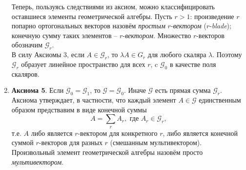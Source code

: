 \documentclass[12pt]{article}
\begin{document}
\begin{enumerate}
    Теперь, пользуясь следствиями из аксиом, можно классифицировать оставшиеся элементы геометрической алгебры. Пусть $r > 1$: произведение $r$ попарно ортогональных векторов назовём \textit{простым} $r$-\textit{вектором} ($r$-\textit{blade}); конечную сумму таких элементов -- $r$-\textit{вектором}. Множество $r$-векторов обозначим $\mathcal{G}_r$. \\
    В силу Аксиомы 3, если $A \in \mathcal{G}_r$, то $\lambda A \in {G}_r$ для любого скаляра $\lambda$. Поэтому $\mathcal{G}_r$ образует линейное пространство для всех $r$, c $\mathcal{G}_0$ в качестве поля скаляров.
\item[]\textbf{Аксиома 5}.
      Если $\mathcal{G}_0 = \mathcal{G}_1$, то $\mathcal{G} = \mathcal{G}_0$. Иначе $\mathcal{G}$ есть прямая сумма $\mathcal{G}_r$. \\
    Аксиома утверждает, в частности, что каждый элемент $A \in \mathcal{G}$ единственным образом предствавим в виде конечной суммы 
    $$A = \sum_r A_r, \text{ где } A_r \in \mathcal{G}_r,$$
    т.е. $A$ либо является $r$-вектором для конкретного $r$, либо является конечной суммой $r$-векторов для разных $r$ (смешанным мультивектором). \\
    Произвольный элемент геометрической алгебры назовём просто \textit{мультивектором}.
    
\end{enumerate}
\end{document}
